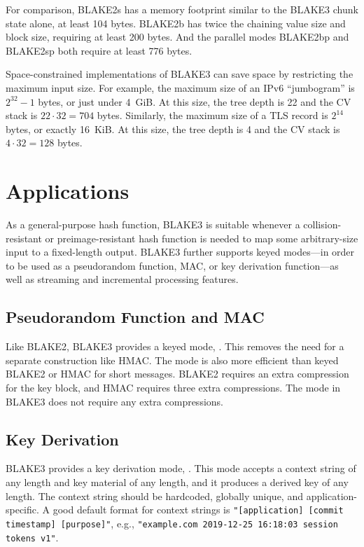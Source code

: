 \documentclass[11pt,notitlepage,a4paper]{article}
\newcommand{\flag}[1]{\texttt{\detokenize{#1}}\xspace}
\begin{document}
For comparison, BLAKE2s has a memory footprint similar to the BLAKE3 chunk
state alone, at least 104 bytes. BLAKE2b has twice the chaining value size and
block size, requiring at least 200 bytes. And the parallel modes BLAKE2bp and
BLAKE2sp both require at least 776 bytes.

Space-constrained implementations of BLAKE3 can save space by restricting the
maximum input size. For example, the maximum size of an IPv6 ``jumbogram'' is
$2^{32}-1$ bytes, or just under 4~GiB. At this size, the tree depth is 22 and
the CV stack is $22 \cdot 32 = 704$ bytes. Similarly, the maximum size of a TLS
record is $2^{14}$ bytes, or exactly 16~KiB. At this size, the tree depth is 4
and the CV stack is $4 \cdot 32 = 128$ bytes.

\section{Applications}\label{sec:applications}

As a general-purpose hash function, BLAKE3 is suitable whenever a
collision-resistant or preimage-resistant hash function is needed to map
some arbitrary-size input to a fixed-length output.
BLAKE3 further supports keyed modes---in order to be used as a pseudorandom
function, MAC, or key derivation function---as well as streaming and
incremental processing features.

\subsection{Pseudorandom Function and MAC}\label{sec:mac}

Like BLAKE2, BLAKE3 provides a keyed mode, \flag{keyed_hash}. This removes the
need for a separate construction like HMAC. The \flag{keyed_hash} mode is also
more efficient than keyed BLAKE2 or HMAC for short messages. BLAKE2 requires an
extra compression for the key block, and HMAC requires three extra
compressions. The \flag{keyed_hash} mode in BLAKE3 does not require any extra
compressions.

\subsection{Key Derivation}\label{sec:kdf}

BLAKE3 provides a key derivation mode, \flag{derive_key}. This mode accepts a
context string of any length and key material of any length, and it produces a
derived key of any length. The context string should be hardcoded, globally
unique, and application-specific. A good default format for context strings is
\texttt{"[application] [commit timestamp] [purpose]"}, e.g.,
\texttt{"example.com 2019-12-25 16:18:03 session tokens v1"}. 
\end{document}
